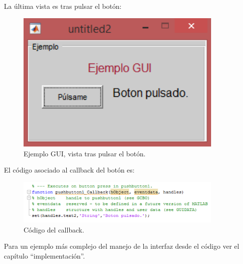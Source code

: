 La última vista es tras pulsar el botón:
\bigskip

\begin{figure}[H]
\centering
\includegraphics[width=0.9\textwidth]{imagenes/figuras/6_6.png}
\caption{Ejemplo GUI, vista tras pulsar el botón.}
\end{figure}
\bigskip

El código asociado al callback del botón es:
\bigskip

\begin{figure}[H]
\centering
\includegraphics[width=0.9\textwidth]{imagenes/figuras/6_7.png}
\caption{Código del callback.}
\end{figure}
\bigskip

Para un ejemplo más complejo del manejo de la interfaz desde el código ver el capítulo “implementación”.